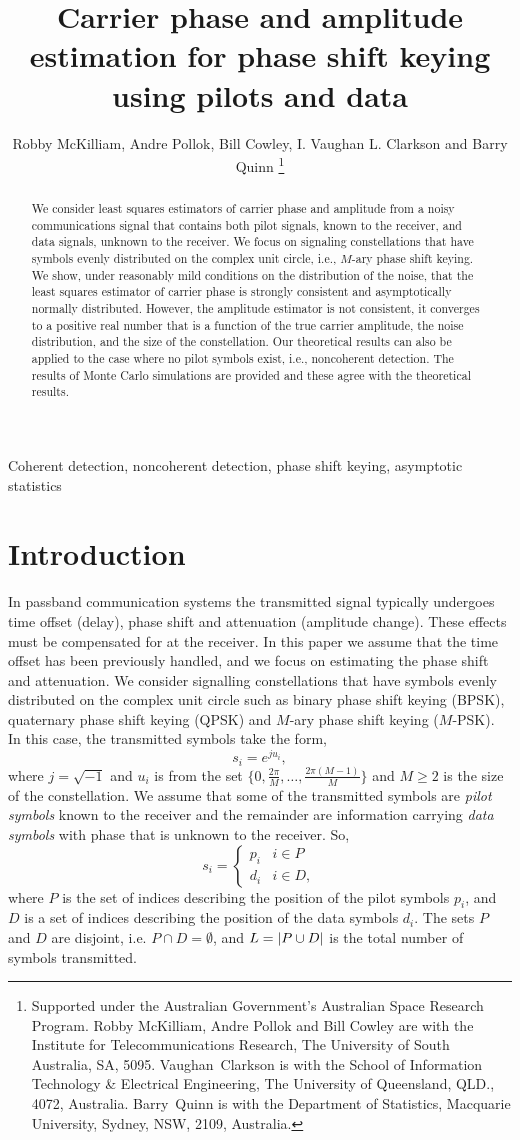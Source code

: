 \documentclass[journal]{IEEEtran}
\title{Carrier phase and amplitude estimation for phase shift keying using pilots and data}
\author{Robby McKilliam, Andre Pollok, Bill Cowley, I. Vaughan L. Clarkson and Barry Quinn  
\thanks{
Supported under the Australian Government’s Australian Space Research Program.
Robby McKilliam, Andre Pollok and Bill Cowley are with the Institute for Telecommunications Research, The University of South Australia, SA, 5095.  Vaughan~Clarkson is with the School of Information Technology \& Electrical Engineering, The University of Queensland, QLD., 4072, Australia.  Barry~Quinn is with the Department of Statistics, Macquarie University, Sydney, NSW, 2109, Australia.
}}
\begin{document}
\maketitle

\begin{abstract}
We consider least squares estimators of carrier phase and amplitude from a noisy communications signal that contains both pilot signals, known to the receiver, and data signals, unknown to the receiver.  We focus on signaling constellations that have symbols evenly distributed on the complex unit circle, i.e., $M$-ary phase shift keying.  We show, under reasonably mild conditions on the distribution of the noise, that the least squares estimator of carrier phase is strongly consistent and asymptotically normally distributed.  However, the amplitude estimator is not consistent, it converges to a positive real number that is a function of the true carrier amplitude, the noise distribution, and the size of the constellation.  Our theoretical results can also be applied to the case where no pilot symbols exist, i.e., noncoherent detection.  The results of Monte Carlo simulations are provided and these agree with the theoretical results.   
\end{abstract}
\begin{IEEEkeywords}
Coherent detection, noncoherent detection, phase shift keying, asymptotic statistics
\end{IEEEkeywords}

\section{Introduction}

In passband communication systems the transmitted signal typically undergoes time offset (delay), phase shift and attenuation (amplitude change).  These effects must be compensated for at the receiver. In this paper we assume that the time offset has been previously handled, and we focus on estimating the phase shift and attenuation.  We consider signalling constellations that have symbols evenly distributed on the complex unit circle such as binary phase shift keying (BPSK), quaternary phase shift keying (QPSK) and $M$-ary phase shift keying ($M$-PSK).  In this case, the transmitted symbols take the form,
\[
s_i = e^{j u_i},
\]
where $j = \sqrt{-1}$ and $u_i$ is from the set $\{0, \tfrac{2\pi}{M}, \dots, \tfrac{2\pi(M-1)}{M}\}$ and $M \geq 2$ is the size of the constellation.  We assume that some of the transmitted symbols are \emph{pilot symbols} known to the receiver and the remainder are information carrying \emph{data symbols} with phase that is unknown to the receiver.  So,
\[
s_i = \begin{cases}
p_i & i \in P \\
d_i & i \in D,
\end{cases}
\]
where $P$ is the set of indices describing the position of the pilot symbols $p_i$, and $D$ is a set of indices describing the position of the data symbols $d_i$.  The sets $P$ and $D$ are disjoint, i.e. $P \cap D = \emptyset$, and $L = {\left\vert P \cup D \right\vert}$ is the total number of symbols transmitted.
\end{document}
